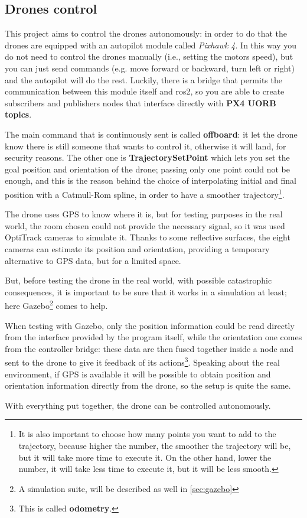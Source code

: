 \subsection{Drones control}

This project aims to control the drones autonomously: in order to do that the drones are equipped with an autopilot module called \textit{Pixhawk 4}. In this way you do not need to control the drones manually (i.e., setting the motors speed), but you can just send commands (e.g. move forward or backward, turn left or right) and the autopilot will do the rest. Luckily, there is a bridge that permits the communication between this module itself and \acrshort{ros}2, so you are able to create subscribers and publishers nodes that interface directly with \textbf{PX4 UORB topics}\cite{px4}.

The main command that is continuously sent is called \textbf{offboard}: it let the drone know there is still someone that wants to control it, otherwise it will land, for security reasons. The other one is \textbf{TrajectorySetPoint} which lets you set the goal position and orientation of the drone; passing only one point could not be enough, and this is the reason behind the choice of interpolating initial and final position with a Catmull-Rom spline, in order to have a smoother trajectory\footnote{It is also important to choose how many points you want to add to the trajectory, because higher the number, the smoother the trajectory will be, but it will take more time to execute it. On the other hand, lower the number, it will take less time to execute it, but it will be less smooth.}.

The drone uses GPS to know where it is, but for testing purposes in the real world, the room chosen could not provide the necessary signal, so it was used OptiTrack cameras to simulate it. Thanks to some reflective surfaces, the eight cameras can estimate its position and orientation, providing a temporary alternative to GPS data, but for a limited space.

But, before testing the drone in the real world, with possible catastrophic consequences, it is important to be sure that it works in a simulation at least; here Gazebo\footnote{A simulation suite, will be described as well in \autoref{sec:gazebo}} comes to help.

When testing with Gazebo, only the position information could be read directly from the interface provided by the program itself, while the orientation one comes from the controller bridge: these data are then fused together inside a node and sent to the drone to give it feedback of its actions\footnote{This is called \textbf{odometry}.}. Speaking about the real environment, if GPS is available it will be possible to obtain position and orientation information directly from the drone, so the setup is quite the same. 

With everything put together, the drone can be controlled autonomously.